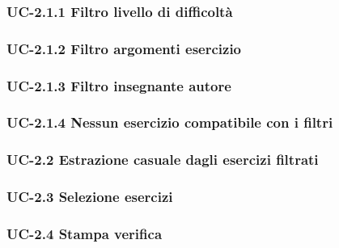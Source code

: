 \subsubsection{UC-2.1.1 Filtro livello di difficoltà}
\subsubsection{UC-2.1.2 Filtro argomenti esercizio}
\subsubsection{UC-2.1.3 Filtro insegnante autore}
\subsubsection{UC-2.1.4 Nessun esercizio compatibile con i filtri}
\subsubsection{UC-2.2 Estrazione casuale dagli esercizi filtrati}
\subsubsection{UC-2.3 Selezione esercizi}
\subsubsection{UC-2.4 Stampa verifica}
